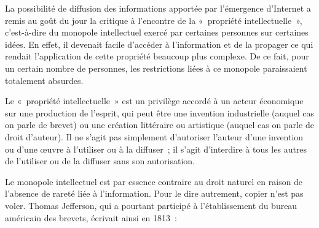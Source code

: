 La possibilité de diffusion des informations apportée par l'émergence d'Internet a remis au goût du jour la critique à l'encontre de la «~propriété intellectuelle~», c'est-à-dire du monopole intellectuel exercé par certaines personnes sur certaines idées. En effet, il devenait facile d'accéder à l'information et de la propager ce qui rendait l'application de cette propriété beaucoup plus complexe. De ce fait, pour un certain nombre de personnes, les restrictions liées à ce monopole paraissaient totalement absurdes. %

Le «~propriété intellectuelle~» est un privilège accordé à un acteur économique sur une production de l'esprit, qui peut être une invention industrielle (auquel cas on parle de brevet) ou une création littéraire ou artistique (auquel cas on parle de droit d'auteur). Il ne s'agit pas simplement d'autoriser l'auteur d'une invention ou d'une œuvre à l'utiliser ou à la diffuser~; il s'agit d'interdire à tous les autres de l'utiliser ou de la diffuser sans son autorisation.

Le monopole intellectuel est par essence contraire au droit naturel en raison de l'absence de rareté liée à l'information. Pour le dire autrement, copier n'est pas voler. Thomas Jefferson, qui a pourtant participé à l'établissement du bureau américain des brevets, écrivait ainsi en 1813~:

